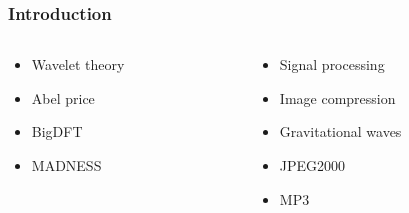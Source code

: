\begin{frame}
\frametitle{Introduction}
\centering

\begin{columns}
\begin{column}[b]{0.5\textwidth}
    \begin{itemize}
        \item   Wavelet theory
        \item   Abel price
        \item   BigDFT
        \item   MADNESS
    \end{itemize}
\end{column}
\begin{column}[b]{0.5\textwidth}
    \begin{itemize}
        \item   Signal processing
        \item   Image compression
        \item   Gravitational waves
        \item   JPEG2000
        \item   MP3
    \end{itemize}
\end{column}
\end{columns}
\end{frame}

